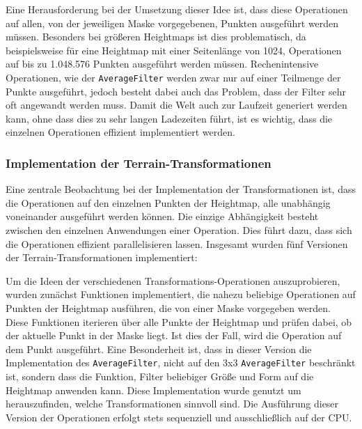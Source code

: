 Eine Herausforderung bei der Umsetzung dieser Idee ist, dass diese Operationen auf allen, von der jeweiligen Maske vorgegebenen, Punkten ausgeführt werden müssen.
Besonders bei größeren Heightmaps ist dies problematisch, da beispielsweise für eine Heightmap mit einer Seitenlänge von 1024, Operationen auf bis zu 1.048.576 Punkten ausgeführt werden müssen.
Rechenintensive Operationen, wie der \texttt{AverageFilter} werden zwar nur auf einer Teilmenge der Punkte ausgeführt, jedoch besteht dabei auch das Problem, dass der Filter sehr oft angewandt werden muss.
Damit die Welt auch zur Laufzeit generiert werden kann, ohne dass dies zu sehr langen Ladezeiten führt, ist es wichtig, dass die einzelnen Operationen effizient implementiert werden.


\subsubsection{Implementation der Terrain-Transformationen}
Eine zentrale Beobachtung bei der Implementation der Transformationen ist, dass die Operationen auf den einzelnen Punkten der Heightmap, alle unabhängig voneinander ausgeführt werden können.
Die einzige Abhängigkeit besteht zwischen den einzelnen Anwendungen einer Operation.
Dies führt dazu, dass sich die Operationen effizient parallelisieren lassen.
Insgesamt wurden fünf Versionen der Terrain-Transformationen implementiert:

Um die Ideen der verschiedenen Transformations-Operationen auszuprobieren, wurden zunächst Funktionen implementiert, die nahezu beliebige Operationen auf Punkten der Heightmap ausführen, die von einer Maske vorgegeben werden.
Diese Funktionen iterieren über alle Punkte der Heightmap und prüfen dabei, ob der aktuelle Punkt in der Maske liegt.
Ist dies der Fall, wird die Operation auf dem Punkt ausgeführt.
Eine Besonderheit ist, dass in dieser Version die Implementation des \texttt{AverageFilter}, nicht auf den 3x3 \texttt{AverageFilter} beschränkt ist, sondern dass die Funktion, Filter beliebiger Größe und Form auf die Heightmap anwenden kann.
Diese Implementation wurde genutzt um herauszufinden, welche Transformationen sinnvoll sind.
Die Ausführung dieser Version der Operationen erfolgt stets sequenziell und ausschließlich auf der CPU.

